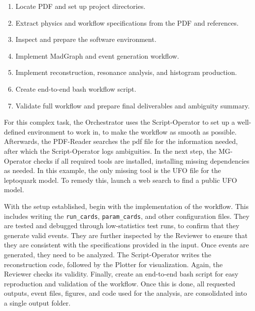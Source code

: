 \documentclass[submission, Phys]{SciPost}
\begin{document}
\begin{planblock}[Plan]
\begin{enumerate}[leftmargin=*, label=\textbf{Step \arabic*:}, itemsep=0.6em]

\item Locate PDF and set up project directories.

\item Extract physics and workflow specifications from the PDF and references.

\item Inspect and prepare the software environment.

\item Implement MadGraph and event generation workflow.

\item Implement reconstruction, resonance analysis, and histogram production.

\item Create end-to-end bash workflow script.

\item Validate full workflow and prepare final deliverables and ambiguity summary.

\end{enumerate}
    
\end{planblock}
%
For this complex task, the Orchestrator uses the Script-Operator to set up a well-defined environment to work in, to make the workflow as smooth as possible. Afterwards, the PDF-Reader searches the pdf file for the information needed, after which the Script-Operator logs ambiguities. In the next step, the MG-Operator checks if all required tools are installed, installing missing dependencies as needed. In this example, the only missing tool is the UFO file for the leptoquark model. To remedy this, \ma launch a web search to find a public UFO model.

With the setup established, \ma begin with the implementation of the \mg workflow. This includes writing the \texttt{run\_cards}, \texttt{param\_cards}, and other configuration files. They are tested and debugged through low-statistics test runs, to confirm that they generate valid events. They are further inspected by the Reviewer to ensure that they are consistent with the specifications provided in the input. Once events are generated, they need to be analyzed. The Script-Operator writes the reconstruction code, followed by the Plotter for visualization. Again, the Reviewer checks its validity. Finally, \ma create an end-to-end bash script for easy reproduction and validation of the workflow. Once this is done, all requested outputs, \eg event files, figures, and code used for the analysis, are consolidated into a single output folder.
\end{document}

